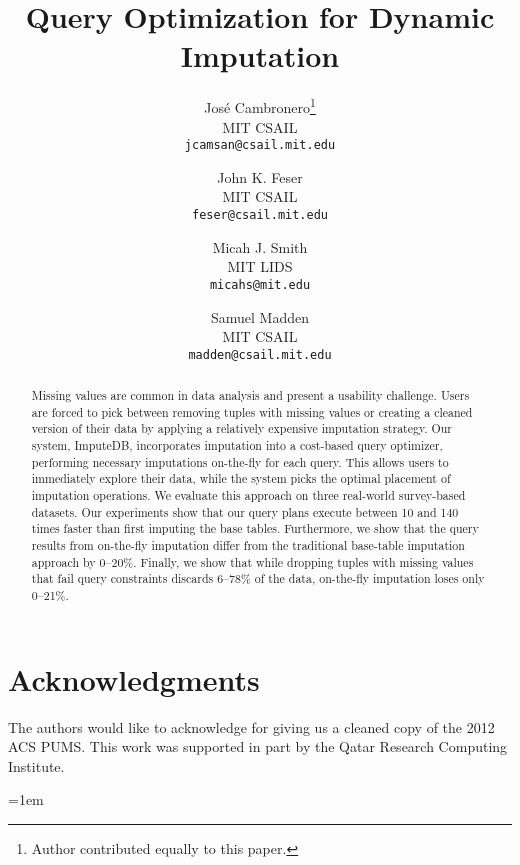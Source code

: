 \documentclass{vldb}
\title{Query Optimization for Dynamic Imputation}
\author{
  Jos\'e Cambronero\thanks{Author contributed equally to this paper.} \\
  MIT CSAIL \\
  \texttt{jcamsan@csail.mit.edu}
  \and
  John K. Feser\footnotemark[1] \\
  MIT CSAIL \\
  \texttt{feser@csail.mit.edu}
  \and
  Micah J. Smith\footnotemark[1] \\
  MIT LIDS \\
  \texttt{micahs@mit.edu}
  \and
  Samuel Madden \\
  MIT CSAIL \\
  \texttt{madden@csail.mit.edu}}
\newcommand{\ProjectName}{ImputeDB\xspace}
\newcommand{\lowxalphazero}{10} %
\newcommand{\highxalphazero}{140} %
\newcommand{\lowsmapealphazero}{0} %
\newcommand{\highsmapealphaone}{20} %
\begin{document}
\maketitle

\begin{abstract}
  Missing values are common in data analysis and present a usability challenge.
  Users are forced to pick between removing tuples with missing values or creating a cleaned version of their data by applying a relatively expensive imputation strategy.
  Our system, \ProjectName{}, incorporates imputation into a cost-based query optimizer, performing necessary imputations on-the-fly for each query.
  This allows users to immediately explore their data, while the system picks the optimal placement of imputation operations.
  We evaluate this approach on three real-world survey-based datasets.
  Our experiments show that our query plans execute between \lowxalphazero{} and \highxalphazero{} times faster than first imputing the base tables.
  Furthermore, we show that the query results from on-the-fly imputation differ from the
  traditional base-table imputation approach by \lowsmapealphazero{}--\highsmapealphaone{}\%.
  Finally, we show that while dropping tuples with missing values that fail query constraints discards 6--78\% of the data, on-the-fly imputation loses only 0--21\%.
\end{abstract}









\section{Acknowledgments}
The authors would like to acknowledge \citeauthor{akande2015empirical} for giving us a cleaned copy of the 2012 ACS PUMS.
This work was supported in part by the Qatar Research Computing Institute.

\emergencystretch=1em
\printbibliography
\balance
\end{document}

